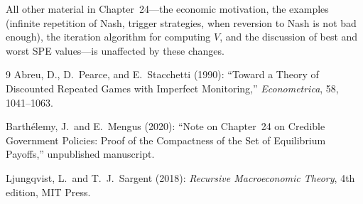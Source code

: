 \documentclass[12pt]{article}
\theoremstyle{definition}
\begin{document}
\medskip
\noindent
All other material in Chapter~24---the economic motivation, the examples
(infinite repetition of Nash, trigger strategies, when reversion to Nash is not
bad enough), the iteration algorithm for computing $V$, and the discussion of
best and worst SPE values---is unaffected by these changes.

\begin{thebibliography}{9}
Abreu, D., D.\ Pearce, and E.\ Stacchetti (1990):
``Toward a Theory of Discounted Repeated Games with Imperfect Monitoring,''
\textit{Econometrica}, 58, 1041--1063.

Barth\'{e}lemy, J.\ and E.\ Mengus (2020):
``Note on Chapter~24 on Credible Government Policies: Proof of the Compactness
of the Set of Equilibrium Payoffs,'' unpublished manuscript.

Ljungqvist, L.\ and T.\ J.\ Sargent (2018):
\textit{Recursive Macroeconomic Theory}, 4th edition, MIT Press.
\end{thebibliography}
\end{document}
